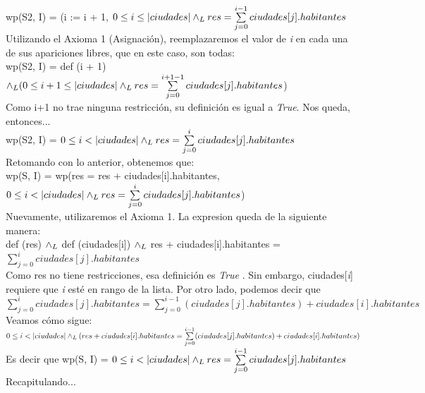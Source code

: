 \documentclass[10pt,a4paper]{article}
\begin{document}
    wp(S2, I) = (i := i + 1, $0 \leq i \leq |ciudades| \land _L res = \sum\limits_{j=0}^{i - 1}ciudades[j].habitantes$ \\

    Utilizando el Axioma 1 (Asignación), reemplazaremos el valor de \textit{i} en cada una de sus apariciones libres, que en este caso, son todas: \\
    wp(S2, I) = def (i + 1) $\land _L (0 \leq i+1 \leq |ciudades| \land _L res = \sum\limits_{j=0}^{i + 1 - 1}ciudades[j].habitantes$)\\
    Como i+1 no trae ninguna restricción, su definición es igual a \textit{True}. Nos queda, entonces...\\
    
    wp(S2, I) = $0 \leq i < |ciudades| \land _L res = \sum\limits_{j=0}^{i}ciudades[j].habitantes$\\
    
    Retomando con lo anterior, obtenemos que:\\

    wp(S, I) = wp(res = res + ciudades[i].habitantes, $0 \leq i < |ciudades| \land _L res = \sum\limits_{j=0}^{i}ciudades[j].habitantes$)\\

    Nuevamente, utilizaremos el Axioma 1. La expresion queda de la siguiente manera:\\
    
    def (res) $\land _L$ def (ciudades[i]) $\land _L$ res + ciudades[i].habitantes = $\sum\limits_{j=0}^{i}ciudades[j].habitantes$\\

    Como res no tiene restricciones, esa definición es \textit{True }. Sin embargo, ciudades[\textit{i}] requiere que \textit{i} esté en rango de la lista. Por otro lado, podemos decir que $\sum\limits_{j=0}^{i}ciudades[j].habitantes = \sum\limits_{j=0}^{i-1}(ciudades[j].habitantes) + ciudades[i].habitantes$ Veamos cómo sigue:\\

    $0 \leq i < |ciudades| \land _L (res + ciudades[i].habitantes = \sum\limits_{j=0}^{i-1}(ciudades[j].habitantes) + ciudades[i].habitantes)$ \\
    
    Es decir que wp(S, I) = $0 \leq i < |ciudades| \land _L res = \sum\limits_{j=0}^{i-1}ciudades[j].habitantes$\\

    Recapitulando...\\
\end{document}
